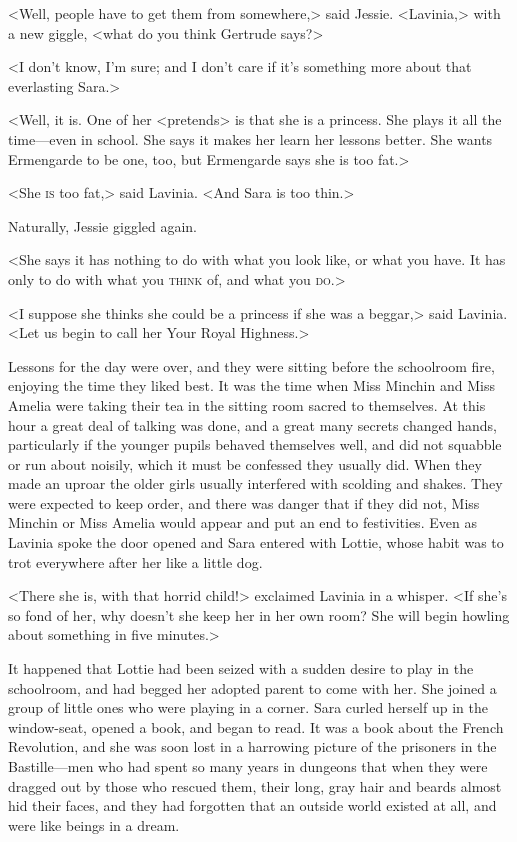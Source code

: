 <Well, people have to get them from somewhere,> said Jessie. <Lavinia,> with a new giggle, <what do you think Gertrude says?>

<I don't know, I'm sure; and I don't care if it's something more about that everlasting Sara.>

<Well, it is. One of her <pretends> is that she is a princess. She plays it all the time—even in school. She says it makes her learn her lessons better. She wants Ermengarde to be one, too, but Ermengarde says she is too fat.>

<She \textsc{is} too fat,> said Lavinia. <And Sara is too thin.>

Naturally, Jessie giggled again.

<She says it has nothing to do with what you look like, or what you have. It has only to do with what you \textsc{think} of, and what you \textsc{do}.>

<I suppose she thinks she could be a princess if she was a beggar,> said Lavinia. <Let us begin to call her Your Royal Highness.>

Lessons for the day were over, and they were sitting before the schoolroom fire, enjoying the time they liked best. It was the time when Miss Minchin and Miss Amelia were taking their tea in the sitting room sacred to themselves. At this hour a great deal of talking was done, and a great many secrets changed hands, particularly if the younger pupils behaved themselves well, and did not squabble or run about noisily, which it must be confessed they usually did. When they made an uproar the older girls usually interfered with scolding and shakes. They were expected to keep order, and there was danger that if they did not, Miss Minchin or Miss Amelia would appear and put an end to festivities. Even as Lavinia spoke the door opened and Sara entered with Lottie, whose habit was to trot everywhere after her like a little dog.

<There she is, with that horrid child!> exclaimed Lavinia in a whisper. <If she's so fond of her, why doesn't she keep her in her own room? She will begin howling about something in five minutes.>

It happened that Lottie had been seized with a sudden desire to play in the schoolroom, and had begged her adopted parent to come with her. She joined a group of little ones who were playing in a corner. Sara curled herself up in the window-seat, opened a book, and began to read. It was a book about the French Revolution, and she was soon lost in a harrowing picture of the prisoners in the Bastille—men who had spent so many years in dungeons that when they were dragged out by those who rescued them, their long, gray hair and beards almost hid their faces, and they had forgotten that an outside world existed at all, and were like beings in a dream.

